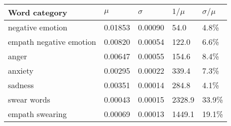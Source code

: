 \begin{tabular}{lllll}
\toprule
Word category &    $\mu$ & $\sigma$ & $1/\mu$ & $\sigma / \mu$ \\
\midrule
negative emotion        &  0.01853 &  0.00090 &    54.0 &          4.8\% \\
empath negative emotion &  0.00820 &  0.00054 &   122.0 &          6.6\% \\
anger                   &  0.00647 &  0.00055 &   154.6 &          8.4\% \\
anxiety                 &  0.00295 &  0.00022 &   339.4 &          7.3\% \\
sadness                 &  0.00351 &  0.00014 &   284.8 &          4.1\% \\
swear words             &  0.00043 &  0.00015 &  2328.9 &         33.9\% \\
empath swearing         &  0.00069 &  0.00013 &  1449.1 &         19.1\% \\
\bottomrule
\end{tabular}
